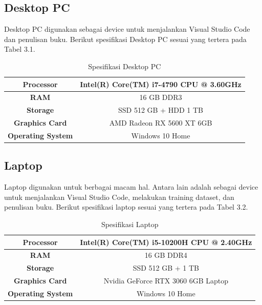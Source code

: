 \subsection{Desktop PC}
\label{subsec:desktop}
Desktop PC digunakan sebagai device untuk menjalankan Visual Studio Code dan penulisan buku. Berikut spesifikasi Desktop PC sesuai yang tertera pada Tabel 3.1.

\begin{table}[h]
	\centering
	
	\caption{Spesifikasi Desktop PC}
	\begin{adjustbox}{width=0.7\columnwidth, center}
	\begin{tabular}{|c|c|}
		\hline
		\textbf{Processor}        & Intel(R) Core(TM) i7-4790 CPU @ 3.60GHz \\ \hline
		\textbf{RAM}              & 16 GB DDR3                                \\ \hline
		\textbf{Storage}          & SSD 512 GB + HDD 1 TB                         \\ \hline
		\textbf{Graphics Card}    & AMD Radeon RX 5600 XT 6GB        \\ \hline
		\textbf{Operating System} & Windows 10 Home                           \\ \hline
	\end{tabular}
	\end{adjustbox}
	\label{fig:desktoptable}
\end{table}

\subsection{Laptop}
\label{subsec:laptop}

	Laptop digunakan untuk berbagai macam hal. Antara lain adalah sebagai device untuk menjalankan Visual Studio Code, melakukan training dataset, dan penulisan buku. Berikut spesifikasi laptop sesuai yang tertera pada Tabel 3.2.
	
	\begin{table}[h]
		\centering
		
		\caption{Spesifikasi Laptop}
		\begin{adjustbox}{width=0.7\columnwidth, center}
		\begin{tabular}{|c|c|}
			\hline
			\textbf{Processor}        & Intel(R) Core(TM) i5-10200H CPU @ 2.40GHz \\ \hline
			\textbf{RAM}              & 16 GB DDR4                                \\ \hline
			\textbf{Storage}          & SSD 512 GB + 1 TB                         \\ \hline
			\textbf{Graphics Card}    & Nvidia GeForce RTX 3060 6GB Laptop        \\ \hline
			\textbf{Operating System} & Windows 10 Home                           \\ \hline
		\end{tabular}
	\end{adjustbox}
		\label{fig:laptoptable}
	\end{table}

